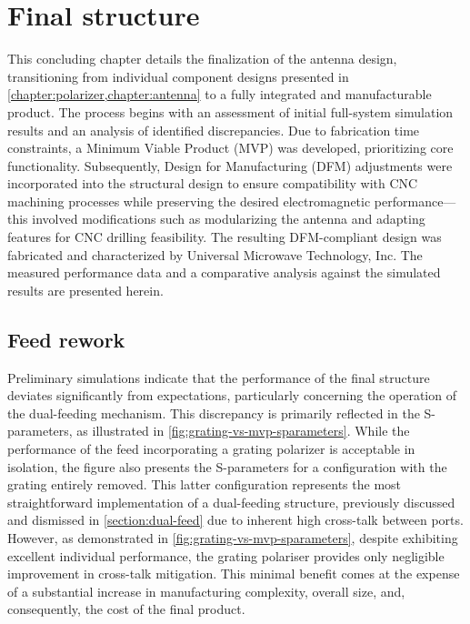 \documentclass[11pt,a4paper,twoside,openany]{report}
\begin{document}
\chapter{Final structure}
\label{chapter:final-structure}
This concluding chapter details the finalization of the antenna design, transitioning from individual component designs presented in \cref{chapter:polarizer,chapter:antenna} to a fully integrated and manufacturable product. The process begins with an assessment of initial full-system simulation results and an analysis of identified discrepancies. Due to fabrication time constraints, a Minimum Viable Product (MVP) was developed, prioritizing core functionality. Subsequently, Design for Manufacturing (DFM) adjustments were incorporated into the structural design to ensure compatibility with CNC machining processes while preserving the desired electromagnetic performance---this involved modifications such as modularizing the antenna and adapting features for CNC drilling feasibility. The resulting DFM-compliant design was fabricated and characterized by Universal Microwave Technology, Inc. The measured performance data and a comparative analysis against the simulated results are presented herein.

\section{Feed rework}
Preliminary simulations indicate that the performance of the final structure deviates significantly from expectations, particularly concerning the operation of the dual-feeding mechanism. This discrepancy is primarily reflected in the S-parameters, as illustrated in \cref{fig:grating-vs-mvp-sparameters}. While the performance of the feed incorporating a grating polarizer is acceptable in isolation, the figure also presents the S-parameters for a configuration with the grating entirely removed. This latter configuration represents the most straightforward implementation of a dual-feeding structure, previously discussed and dismissed in \cref{section:dual-feed} due to inherent high cross-talk between ports. However, as demonstrated in \cref{fig:grating-vs-mvp-sparameters}, despite exhibiting excellent individual performance, the grating polariser provides only negligible improvement in cross-talk mitigation. This minimal benefit comes at the expense of a substantial increase in manufacturing complexity, overall size, and, consequently, the cost of the final product.
\end{document}
